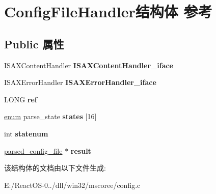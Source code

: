 \hypertarget{struct_config_file_handler}{}\section{Config\+File\+Handler结构体 参考}
\label{struct_config_file_handler}
\subsection*{Public 属性}
\begin{DoxyCompactItemize}
\item 
\mbox{\label{struct_config_file_handler_a51a8a1f2ddfcb199edcb74261a35989b}} 
I\+S\+A\+X\+Content\+Handler {\bfseries I\+S\+A\+X\+Content\+Handler\+\_\+iface}
\item 
\mbox{\label{struct_config_file_handler_acf9799e30546c0e6fa61dd856d972c83}} 
I\+S\+A\+X\+Error\+Handler {\bfseries I\+S\+A\+X\+Error\+Handler\+\_\+iface}
\item 
\mbox{\label{struct_config_file_handler_a8a84394cf12fa20d9bcf342c891e82cf}} 
L\+O\+NG {\bfseries ref}
\item 
\mbox{\label{struct_config_file_handler_ac529a2113401cc4c9a5dfe7ca201e8a8}} 
\hyperlink{interfaceenum}{enum} parse\+\_\+state {\bfseries states} \mbox{[}16\mbox{]}
\item 
\mbox{\label{struct_config_file_handler_a234865ed7711e6942e0e2a1ac41a4217}} 
int {\bfseries statenum}
\item 
\mbox{\label{struct_config_file_handler_a30d93d81c64bf93e5642b2511d8df7c7}} 
\hyperlink{structparsed__config__file}{parsed\+\_\+config\+\_\+file} $\ast$ {\bfseries result}
\end{DoxyCompactItemize}


该结构体的文档由以下文件生成\+:\begin{DoxyCompactItemize}
\item 
E\+:/\+React\+O\+S-\/0../dll/win32/mscoree/config.\+c\end{DoxyCompactItemize}

